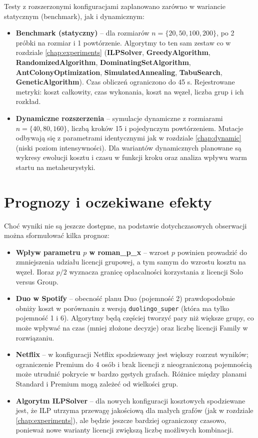 Testy z rozszerzonymi konfiguracjami zaplanowano zarówno w wariancie statycznym (benchmark), jak i dynamicznym:

\begin{itemize}
\item \textbf{Benchmark (statyczny)} -- dla rozmiarów $n = \{20, 50, 100, 200\}$, po 2 próbki na rozmiar i 1 powtórzenie. Algorytmy to ten sam zestaw co w rozdziale \ref{chap:experiments} (\textbf{ILPSolver}, \textbf{GreedyAlgorithm}, \textbf{RandomizedAlgorithm}, \textbf{DominatingSetAlgorithm}, \textbf{AntColonyOptimization}, \textbf{SimulatedAnnealing}, \textbf{TabuSearch}, \textbf{GeneticAlgorithm}). Czas obliczeń ograniczono do 45 s. Rejestrowane metryki: koszt całkowity, czas wykonania, koszt na węzeł, liczba grup i ich rozkład.

\item \textbf{Dynamiczne rozszerzenia} -- symulacje dynamiczne z rozmiarami $n = \{40, 80, 160\}$, liczbą kroków 15 i pojedynczym powtórzeniem. Mutacje odbywają się z parametrami identycznymi jak w rozdziale \ref{chap:dynamic} (niski poziom intensywności). Dla wariantów dynamicznych planowane są wykresy ewolucji kosztu i czasu w funkcji kroku oraz analiza wpływu warm startu na metaheurystyki.
\end{itemize}

\section{Prognozy i oczekiwane efekty}

Choć wyniki nie są jeszcze dostępne, na podstawie dotychczasowych obserwacji można sformułować kilka prognoz:

\begin{itemize}
\item \textbf{Wpływ parametru $p$ w roman\_p\_x} -- wzrost $p$ powinien prowadzić do zmniejszenia udziału licencji grupowej, a tym samym do wzrostu kosztu na węzeł. Iloraz $p/2$ wyznacza granicę opłacalności korzystania z licencji Solo versus Group.

\item \textbf{Duo w Spotify} -- obecność planu Duo (pojemność 2) prawdopodobnie obniży koszt w porównaniu z wersją \texttt{duolingo\_super} (która ma tylko pojemność 1 i 6). Algorytmy będą częściej tworzyć pary niż większe grupy, co może wpływać na czas (mniej złożone decyzje) oraz liczbę licencji Family w rozwiązaniu.

\item \textbf{Netflix} -- w konfiguracji Netflix spodziewany jest większy rozrzut wyników; ograniczenie Premium do 4 osób i brak licencji z nieograniczoną pojemnością może utrudnić pokrycie w bardzo gęstych grafach. Różnice między planami Standard i Premium mogą zależeć od wielkości grup.

\item \textbf{Algorytm ILPSolver} -- dla nowych konfiguracji kosztowych spodziewane jest, że ILP utrzyma przewagę jakościową dla małych grafów (jak w rozdziale \ref{chap:experiments}), ale będzie jeszcze bardziej ograniczony czasowo, ponieważ nowe warianty licencji zwiększą liczbę możliwych kombinacji.
\end{itemize}

